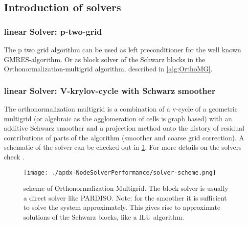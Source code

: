 \subsection{Introduction of solvers}

\subsubsection{linear Solver: p-two-grid}
\label{sec:ptg_gmres}

The p two grid algorithm can be used as left preconditioner for the well known GMRES-algorithm. Or as block solver of the Schwarz blocks in the Orthonormalization-multigrid algorithm, described in \ref{alg:OrthoMG}.

\subsubsection{linear Solver: V-krylov-cycle with Schwarz smoother}
\label{sec:kcycle}

The orthonormalization multigrid is a combination of a v-cycle of a geometric multigrid (or algebraic as the agglomeration of cells is graph based) with an additive Schwarz smoother and a projection method onto the history of residual contributions of parts of the algorithm (smoother and coarse grid correction). A schematic of the solver can be checked out in \ref{fig:SolverScheme}. 
For more details on the solvers check \cite{OpenSoftwarePDE}.

\begin{figure}[!h]
	\begin{center}
		\texttt{[image: ./apdx-NodeSolverPerformance/solver-scheme.png]}
		
	\end{center}
	\caption{
		scheme of Orthonormalization Multigrid. The block solver is usually a direct solver like PARDISO. Note: for the smoother it is sufficient to solve the system approximately. This gives rise to approximate solutions of the Schwarz blocks, like a ILU algorithm.  
	}
	\label{fig:SolverScheme}
\end{figure}

